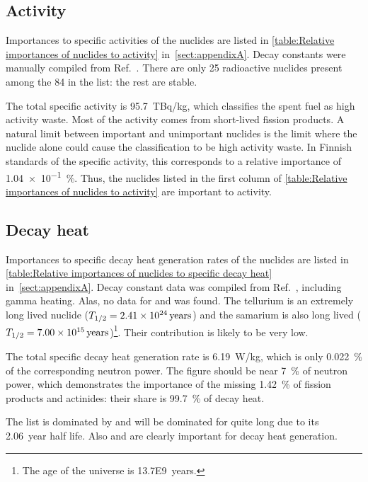 \subsection{Activity}

Importances to specific activities of the nuclides are listed in \autoref{table:Relative importances of nuclides to activity} in~\autoref{sect:appendixA}. Decay constants were manually compiled from Ref.~\cite{nndc}. There are only \num{25} radioactive nuclides present among the \num{84} in the list: the rest are stable.

The total specific activity is \SI{95.7}{TBq/kg}, which classifies the spent fuel as high activity waste. Most of the activity comes from short-lived fission products. A natural limit between important and unimportant nuclides is the limit where the nuclide alone could cause the classification to be high activity waste. In Finnish standards of the specific activity, this corresponds to a relative importance of \SI{1.04e-1}{\%}. Thus, the nuclides listed in the first column of \autoref{table:Relative importances of nuclides to activity} are important to activity.

\subsection{Decay heat}

Importances to specific decay heat generation rates of the nuclides are listed in \autoref{table:Relative importances of nuclides to specific decay heat} in~\autoref{sect:appendixA}. Decay constant data was compiled from Ref.~\cite{endf}, including gamma heating. Alas, no data for  and  was found. The tellurium is an extremely long lived nuclide ($T_{1/2}=\SI{2.41E24}{years}$) and the samarium is also long lived ($T_{1/2}=\SI{7.00E15}{years}$)\footnote{The age of the universe is \SI{13.7E9}{years}.}. Their contribution is likely to be very low.

The total specific decay heat generation rate is \SI{6.19}{W/kg}, which is only \SI{0.022}{\%} of the corresponding neutron power. The figure should be near \SI{7}{\%} of neutron power, which demonstrates the importance of the missing \SI{1.42}{\%} of fission products and actinides: their share is \SI{99.7}{\%} of decay heat.

The list is dominated by  and will be dominated for quite long due to its \SI{2.06}{year} half life. Also  and  are clearly important for decay heat generation.

